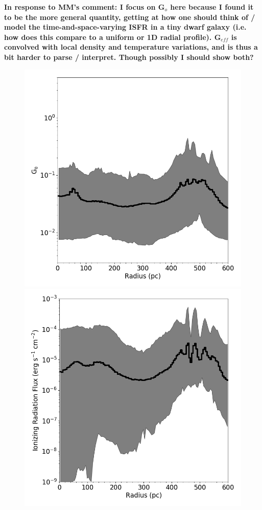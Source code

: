 \documentclass[twocolumn]{aastex61}
\begin{document}
\textbf{In response to MM's comment: I focus on G$_o$ here because I found it to be the more general quantity, getting at how one should think of / model the time-and-space-varying ISFR in a tiny dwarf galaxy (i.e. how does this compare to a uniform or 1D radial profile). G$_{eff}$ is convolved with local density and temperature variations, and is thus a bit harder to parse / interpret. Though possibly I should show both?}

\begin{figure}
\includegraphics[width=0.95\linewidth]{G_o_profile} \\
\includegraphics[width=0.95\linewidth]{ionizing_photon_profile}

\end{figure}
\end{document}
